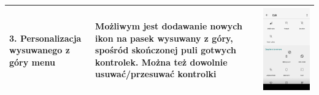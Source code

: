 \documentclass[12pt]{article}
\begin{document}
\begin{longtable}{|p{}|p{}|p{}|}
        3. Personalizacja wysuwanego z góry menu & Możliwym jest dodawanie nowych ikon na pasek wysuwany z góry, spośród skończonej puli gotwych kontrolek. Można też dowolnie usuwać/przesuwać kontrolki & \includegraphics[scale=0.1]{changemenu.png}\\
        \hline

\end{longtable}
\end{document}
